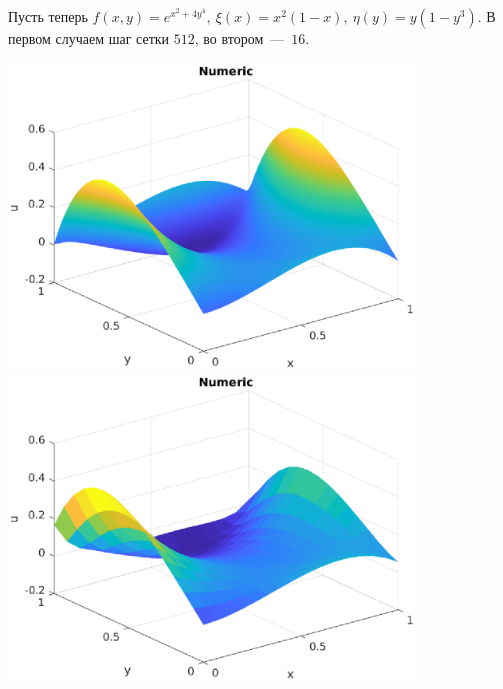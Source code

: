 \documentclass[12pt, a4paper]{article} %
\begin{document}
Пусть теперь $f(x, y) = e^{x^2 + 4y^4},\ \xi(x) = x^2(1 - x),\ \eta(y) = y(1-y^3)$.
В первом случаем шаг сетки $512$, во втором~---~$16$.
\begin{center}
\includegraphics[width=0.81\textwidth]{4_1.eps}\\
\includegraphics[width=0.81\textwidth]{4_2.eps}
\end{center}
\end{document}
